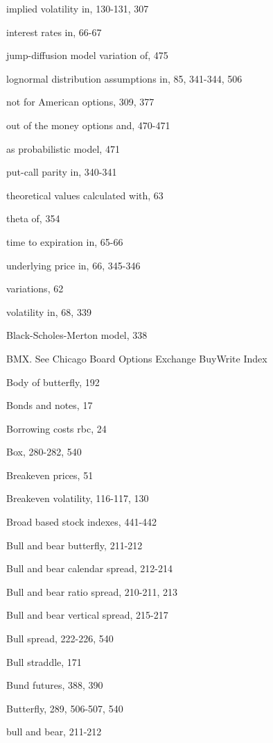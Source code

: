 \noindent implied volatility in, 130-131, 307\par
\noindent interest rates in, 66-67\par
\noindent jump-diffusion model variation of, 475\par
lognormal distribution assumptions in, 85, 341-344, 506\par
\noindent not for American options, 309, 377\par
\noindent out of the money options and, 470-471\par
\noindent as probabilistic model, 471\par
\noindent put-call parity in, 340-341\par
\noindent theoretical values calculated with, 63\par
\noindent theta of, 354\par
\noindent time to expiration in, 65-66\par
\noindent underlying price in, 66, 345-346\par
\noindent variations, 62\par
\noindent volatility in, 68, 339\par
\noindent Black-Scholes-Merton model, 338\par
\noindent BMX. See Chicago Board Options Exchange BuyWrite Index\par
\noindent Body of butterfly, 192\par
\noindent Bonds and notes, 17\par
\noindent Borrowing costs rbc, 24\par
\noindent Box, 280-282, 540\par
\noindent Breakeven prices, 51\par
\noindent Breakeven volatility, 116-117, 130\par
\noindent Broad based stock indexes, 441-442\par
\noindent Bull and bear butterfly, 211-212\par
\noindent Bull and bear calendar spread, 212-214\par
\noindent Bull and bear ratio spread, 210-211, 213\par
\noindent Bull and bear vertical spread, 215-217\par
\noindent Bull spread, 222-226, 540\par
\noindent Bull straddle, 171\par
\noindent Bund futures, 388, 390\par
\noindent Butterfly, 289, 506-507, 540\par
\noindent bull and bear, 211-212\par

